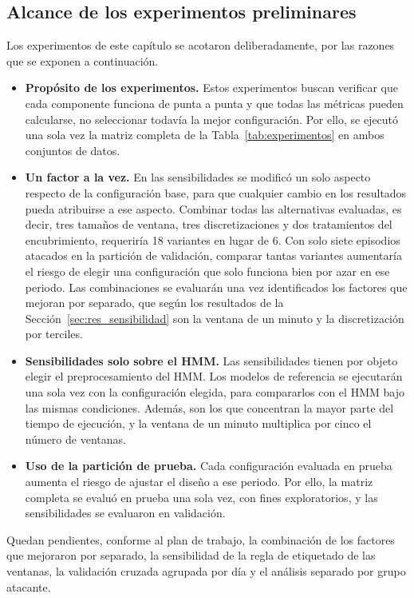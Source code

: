 \subsection{Alcance de los experimentos preliminares}
\label{sec:alcance_experimentos}
Los experimentos de este capítulo se acotaron deliberadamente, por las razones que se exponen a continuación.

\begin{itemize}
    \item \textbf{Propósito de los experimentos.} Estos experimentos buscan verificar que cada componente funciona de punta a punta y que todas las métricas pueden calcularse, no seleccionar todavía la mejor configuración. Por ello, se ejecutó una sola vez la matriz completa de la Tabla~\ref{tab:experimentos} en ambos conjuntos de datos.
    \item \textbf{Un factor a la vez.} En las sensibilidades se modificó un solo aspecto respecto de la configuración base, para que cualquier cambio en los resultados pueda atribuirse a ese aspecto. Combinar todas las alternativas evaluadas, es decir, tres tamaños de ventana, tres discretizaciones y dos tratamientos del encubrimiento, requeriría 18 variantes en lugar de 6. Con solo siete episodios atacados en la partición de validación, comparar tantas variantes aumentaría el riesgo de elegir una configuración que solo funciona bien por azar en ese periodo. Las combinaciones se evaluarán una vez identificados los factores que mejoran por separado, que según los resultados de la Sección~\ref{sec:res_sensibilidad} son la ventana de un minuto y la discretización por terciles.
    \item \textbf{Sensibilidades solo sobre el HMM.} Las sensibilidades tienen por objeto elegir el preprocesamiento del HMM. Los modelos de referencia se ejecutarán una sola vez con la configuración elegida, para compararlos con el HMM bajo las mismas condiciones. Además, son los que concentran la mayor parte del tiempo de ejecución, y la ventana de un minuto multiplica por cinco el número de ventanas.
    \item \textbf{Uso de la partición de prueba.} Cada configuración evaluada en prueba aumenta el riesgo de ajustar el diseño a ese periodo. Por ello, la matriz completa se evaluó en prueba una sola vez, con fines exploratorios, y las sensibilidades se evaluaron en validación.
\end{itemize}

Quedan pendientes, conforme al plan de trabajo, la combinación de los factores que mejoraron por separado, la sensibilidad de la regla de etiquetado de las ventanas, la validación cruzada agrupada por día y el análisis separado por grupo atacante.

